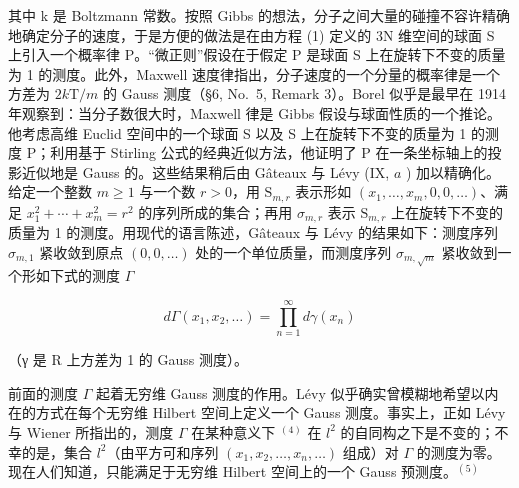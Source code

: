 其中 k 是 Boltzmann 常数。按照 Gibbs 的想法，分子之间大量的碰撞不容许精确地确定分子的速度，于是方便的做法是在由方程 (1) 定义的 3N 维空间的球面 S 上引入一个概率律 P。“微正则”假设在于假定 P 是球面 S 上在旋转下不变的质量为 1 的测度。此外，Maxwell 速度律指出，分子速度的一个分量的概率律是一个方差为 \(2k\mathrm{T} / m\) 的 Gauss 测度（§6, No.~5, Remark 3）。Borel 似乎是最早在 1914 年观察到：当分子数很大时，Maxwell 律是 Gibbs 假设与球面性质的一个推论。他考虑高维 Euclid 空间中的一个球面 S 以及 S 上在旋转下不变的质量为 1 的测度 P；利用基于 Stirling 公式的经典近似方法，他证明了 P 在一条坐标轴上的投影近似地是 Gauss 的。这些结果稍后由 Gâteaux 与 Lévy (IX, \(a\) ) 加以精确化。给定一个整数 \(m \geqslant 1\) 与一个数 \(r > 0\)，用 \(\mathrm{S}_{m,r}\) 表示形如 \((x_{1}, \ldots, x_{m}, 0, 0, \ldots)\)、满足 \(x_{1}^{2} + \cdots + x_{m}^{2} = r^{2}\) 的序列所成的集合；再用 \(\sigma_{m,r}\) 表示 \(\mathrm{S}_{m,r}\) 上在旋转下不变的质量为 1 的测度。用现代的语言陈述，Gâteaux 与 Lévy 的结果如下：测度序列 \(\sigma_{m,1}\) 紧收敛到原点 \((0, 0, \ldots)\) 处的一个单位质量，而测度序列 \(\sigma_{m,\sqrt{m}}\) 紧收敛到一个形如下式的测度 \(\Gamma\)

\[
d \Gamma (x _ {1}, x _ {2}, \dots) = \prod_ {n = 1} ^ {\infty} d \gamma (x _ {n})
\]

（γ 是 R 上方差为 1 的 Gauss 测度）。

前面的测度 \(\Gamma\) 起着无穷维 Gauss 测度的作用。Lévy 似乎确实曾模糊地希望以内在的方式在每个无穷维 Hilbert 空间上定义一个 Gauss 测度。事实上，正如 Lévy 与 Wiener 所指出的，测度 \(\Gamma\) 在某种意义下 \(^{(4)}\) 在 \(l^{2}\) 的自同构之下是不变的；不幸的是，集合 \(l^{2}\)（由平方可和序列 \((x_{1}, x_{2}, \ldots, x_{n}, \ldots)\) 组成）对 \(\Gamma\) 的测度为零。现在人们知道，只能满足于无穷维 Hilbert 空间上的一个 Gauss 预测度。\(^{(5)}\)

